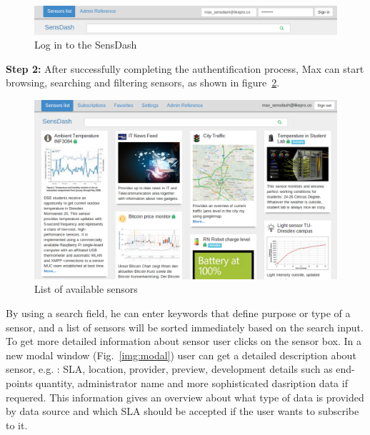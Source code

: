\begin{figure}[!ht]
\centering
\includegraphics[scale=0.6]{Screenshots/signIn.png}   
\caption[Log in to the SensDash]{Log in to the SensDash}
\label{img:log_in}                        
\end{figure}

\textbf{Step 2:} After successfully completing the authentification process, Max can start browsing, searching and filtering sensors, as shown in figure~\ref{img:welcome_screen}.

\begin{figure}[!ht]
\centering
\includegraphics[scale=0.6]{Screenshots/Welcome.png}   
\caption[List of available sensors]{List of available sensors}
\label{img:welcome_screen}                       
\end{figure}

 By using a search field, he can enter keywords that define purpose or type of a sensor, and a list of sensors will be sorted immediately based on the search input. To get more detailed information about sensor user clicks on the sensor box. In a new modal window (Fig.~\ref{img:modal}) user can get a detailed description about sensor, e.g. : SLA, location, provider, preview, development details such as end-points quantity, administrator name and more sophisticated dasription data if requered. This information gives an overview about what type of data is provided by data source and which SLA should be accepted if the user wants to subscribe to it.

